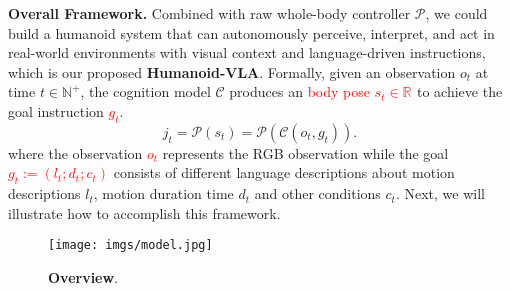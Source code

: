 \textbf{Overall Framework. } 
Combined with raw whole-body controller $\mathcal{P}$, we could build a humanoid system that can autonomously perceive, interpret, and act in real-world environments with visual context and language-driven instructions, which is our proposed \textbf{Humanoid-VLA}.
Formally, given an observation $o_t$
at time $t \in \mathbb{N}^+$,
the cognition model $\mathcal{C}$ produces an \textcolor{red}{body pose $s_t \in \mathbb{R}^{}$}
to achieve the goal instruction \textcolor{red}{$g_t$}.
\[
     j_t = \mathcal{P}(s_t)=\mathcal{P}(\mathcal{C}(o_t, g_t)).
\]
where the observation \textcolor{red}{$o_t$} 
represents the RGB observation
while the goal \textcolor{red}{$g_t := (l_{t}; d_t; c_t)$} 
consists of different language descriptions about
motion descriptions $l_{t}$, 
motion duration time $d_t$ 
and other conditions $c_t$.
Next, we will illustrate how to accomplish this framework.

\begin{figure*}[ht]
  \centering
   \texttt{[image: imgs/model.jpg]}
   \caption{\textbf{Overview}. }
   \label{fig:teaser}
\end{figure*}


